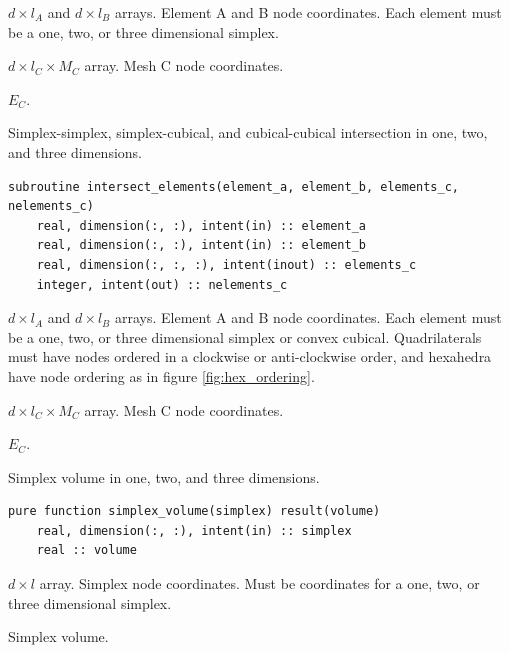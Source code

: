 \documentclass{article}
\begin{document}
\begin{description}[font=\ttfamily\bfseries,leftmargin=2.2\parindent,labelindent=1.7\parindent,noitemsep]
  \item[simplex\_a, simplex\_b] $d \times l_A$ and $d \times l_B$ arrays.
    Element A and B node coordinates. Each element must be a one, two, or three
    dimensional simplex.
  \item[simplex\_c] $d \times l_C \times M_C$ array. Mesh C node coordinates.
  \item[n\_simplices\_c] $E_C$.
\end{description}

\noindent Simplex-simplex, simplex-cubical, and cubical-cubical
intersection in one, two, and three dimensions.

\begin{lstlisting}[language=FORTRAN]
  subroutine intersect_elements(element_a, element_b, elements_c, nelements_c)
    real, dimension(:, :), intent(in) :: element_a
    real, dimension(:, :), intent(in) :: element_b
    real, dimension(:, :, :), intent(inout) :: elements_c
    integer, intent(out) :: nelements_c
\end{lstlisting}

\begin{description}[font=\ttfamily\bfseries,leftmargin=2.2\parindent,labelindent=1.7\parindent,noitemsep]
  \item[element\_a, element\_b] $d \times l_A$ and $d \times l_B$ arrays.
    Element A and B node coordinates. Each element must be a one, two, or three
    dimensional simplex or convex cubical. Quadrilaterals must have nodes
    ordered in a clockwise or anti-clockwise order, and hexahedra have node
    ordering as in figure \ref{fig:hex_ordering}.
  \item[elements\_c] $d \times l_C \times M_C$ array. Mesh C node coordinates.
  \item[n\_simplices\_c] $E_C$.
\end{description}

\noindent Simplex volume in one, two, and three dimensions.

\begin{lstlisting}[language=FORTRAN]
  pure function simplex_volume(simplex) result(volume)
    real, dimension(:, :), intent(in) :: simplex
    real :: volume
\end{lstlisting}

\begin{description}[font=\ttfamily\bfseries,leftmargin=2.2\parindent,labelindent=1.7\parindent,noitemsep]
  \item[simplex] $d \times l$ array. Simplex node coordinates. Must be
    coordinates for a one, two, or three dimensional simplex.
  \item[volume] Simplex volume.
\end{description}
\end{document}
